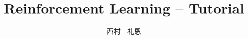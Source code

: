 \documentclass[uplatex, report]{jsbook} %
\theoremstyle{definition}
\theoremstyle{definition}
\theoremstyle{remark}
\begin{document}
\title{Reinforcement Learning -- Tutorial}
\author{西村　礼恩}
\maketitle                      %
\tableofcontents





% 

% 

% 

% 
\end{document}
